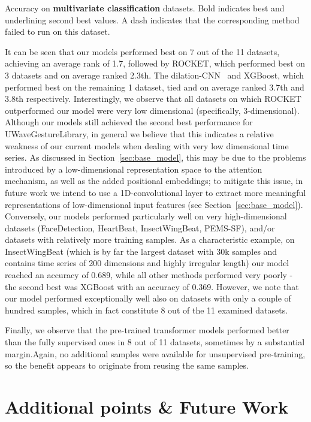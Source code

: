 \documentclass{article} \usepackage{iclr2021_conference,times}
\begin{document}
\begin{table}[h!]
\begin{adjustbox}{width=1.2\textwidth,center=\textwidth}
\end{adjustbox}
\caption{Accuracy on \textbf{multivariate classification} datasets. Bold indicates best and underlining second best values. A dash indicates that the corresponding method failed to run on this dataset.}
\label{tab:performance_classification}
\end{table}


It can be seen that our models performed best on 7 out of the 11 datasets, achieving an average rank of 1.7, followed by ROCKET, which performed best on 3 datasets and on average ranked 2.3th. The dilation-CNN~\citep{franceschi19} and XGBoost, which performed best on the remaining 1 dataset, tied and on average ranked 3.7th and 3.8th respectively. Interestingly, we observe that all datasets on which ROCKET outperformed our model were very low dimensional (specifically, 3-dimensional). Although our models still achieved the second best performance for UWaveGestureLibrary, in general we believe that this indicates a relative weakness of our current models when dealing with very low dimensional time series. As discussed in Section~\ref{sec:base_model}, this may be due to the problems introduced by a low-dimensional representation space to the attention mechanism, as well as the added positional embeddings; to mitigate this issue, in future work we intend to use a 1D-convolutional layer to extract more meaningful representations of low-dimensional input features (see Section~\ref{sec:base_model}).  Conversely, our models performed particularly well on very high-dimensional datasets (FaceDetection, HeartBeat, InsectWingBeat, PEMS-SF), and/or datasets with relatively more training samples. As a characteristic example, on InsectWingBeat (which is by far the largest dataset with 30k samples and contains time series of 200 dimensions and highly irregular length) our model reached an accuracy of 0.689, while all other methods performed very poorly - the second best was XGBoost with an accuracy of 0.369. However, we note that our model performed exceptionally well also on datasets with only a couple of hundred samples, which in fact constitute 8 out of the 11 examined datasets.

Finally, we observe that the pre-trained transformer models performed better than the fully supervised ones in 8 out of 11 datasets, sometimes by a substantial margin.Again, no additional samples were available for unsupervised pre-training, so the benefit appears to originate from reusing the same samples.

\section{Additional points \& Future Work}
\end{document}
